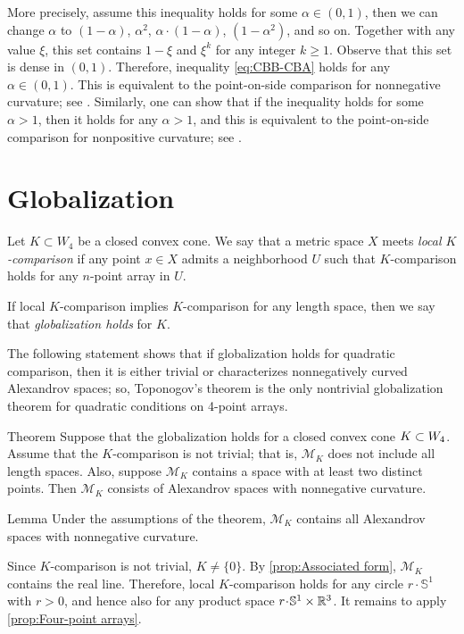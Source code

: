 \documentclass[a4paper,10pt]{article}
\begin{document}
More precisely, assume this inequality holds for some $\alpha\in (0,1)$, then we can change $\alpha$ to $(1-\alpha)$, $\alpha^2$,  $\alpha\cdot (1-\alpha)$, $(1-\alpha^2)$, and so on.
Together with any value $\xi$, this set contains $1-\xi$ and $\xi^k$ for any integer $k\ge 1$.
Observe that this set is dense in $(0,1)$.
Therefore, inequality \ref{eq:CBB-CBA} holds for any $\alpha\in (0,1)$.
This is equivalent to the point-on-side comparison for nonnegative curvature; see \cite[8.14]{AKP-2024}.
Similarly, one can show that if the inequality holds for some $\alpha>1$, then it holds for any $\alpha>1$,
and this is equivalent to the point-on-side comparison for nonpositive curvature; see \cite[9.14]{AKP-2024}.
\qeds

\section{Globalization}\label{par:globalization}

Let $K\subset W_4$ be a closed convex cone.
We say that a metric space $X$ meets \emph{local $K$-comparison} if any point $x\in X$ admits a neighborhood $U$ such that $K$-comparison holds for any $n$-point array in $U$.

If local $K$-comparison implies $K$-comparison for any length space, then we say that \emph{globalization holds} for $K$.

The following statement shows that if globalization holds for quadratic comparison, then it is either trivial or characterizes nonnegatively curved Alexandrov spaces;
so, Toponogov's theorem is the only nontrivial globalization theorem for quadratic conditions on 4-point arrays.

\begin{thm}{Theorem}\label{thm:globalization}
Suppose that the globalization holds for a closed convex cone $K\z\subset W_4$.
Assume that the $K$-comparison is not trivial;
that is, $\mathcal{M}_K$ does not include all length spaces.
Also, suppose $\mathcal{M}_K$ contains a space with at least two distinct points.
Then $\mathcal{M}_K$ consists of Alexandrov spaces with nonnegative curvature.
\end{thm}

\begin{thm}{Lemma}\label{lem:globalization}
Under the assumptions of the theorem, $\mathcal{M}_K$ contains all Alexandrov spaces with nonnegative curvature.
\end{thm}

Since $K$-comparison is not trivial, $K\ne\{0\}$.
By \ref{prop:Associated form}, $\mathcal{M}_K$ contains the real line.
Therefore, local $K$-comparison holds
for any circle $r\cdot \mathbb{S}^1$ with $r>0$, and hence also for any product space $r\cdot \mathbb{S}^1\times\RR^3$.
It remains to apply \ref{prop:Four-point arrays}.
\qeds
\end{document}
